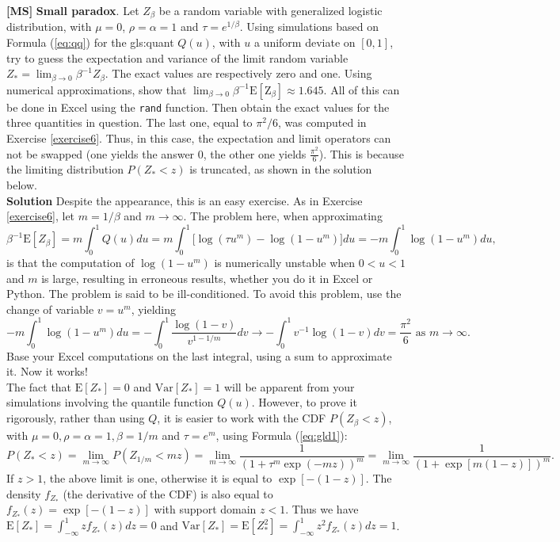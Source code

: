 \documentclass[10pt]{article}
\begin{document}
\begin{Exercise}\label{exercise7}{\bf [MS]} 
 {\bf Small paradox}. Let $Z_\beta$ be a random variable with generalized logistic distribution, with $\mu=0$, $\rho=\alpha=1$ and $\tau=e^{1/\beta}$.
Using simulations based on Formula (\ref{eq:qq}) for the \gls{gls:quant} $Q(u)$, with $u$ a uniform deviate on $[0,1]$, try to guess the expectation and variance of the limit random variable $Z_*=\lim_{\beta\rightarrow 0}\beta^{-1}Z_{\beta}$. The exact values are respectively zero and one. Using numerical approximations, show that $\lim_{\beta\rightarrow 0} \beta^{-1}\mbox{E}[\mbox{Z}_{\beta}]\approx 1.645$. All of this can be done in Excel using the \texttt{rand} function. Then obtain the exact values for the three quantities in question. The last one, equal to $\pi^2/6$, was computed in Exercise \ref{exercise6}. Thus, in this case, the expectation and limit operators can not be swapped 
(one yields the answer $0$, the other one yields $\frac{\pi^2}{6}$). This is because the limiting distribution  $P(Z_*<z)$ 
is \textcolor{index}{truncated}, as shown in the solution below. \vspace{1ex} \\
{\bf Solution} Despite the appearance, this is an easy exercise. As in Exercise \ref{exercise6}, let  $m=1/\beta$ and $m\rightarrow \infty$. The problem here, when approximating 
$$\beta^{-1}\mbox{E}[Z_{\beta}]=m\int_0^1 Q(u)du =m\int_0^1\Big[\log(\tau u^m) - \log(1-u^m)\Big]du
=-m\int_0^1\log(1-u^m)du,$$
is that the computation of $\log(1-u^m)$ is \textcolor{index}{numerically unstable} \cite{num} 
when $0<u<1$ and $m$ is large, resulting in erroneous results, whether you do it in Excel or Python. The problem is said to be ill-conditioned. To avoid this problem, use the change of variable $v=u^m$, yielding
$$-m\int_0^1  \log(1-u^m) du= -\int_0^1\frac{\log(1-v)}{v^{1-1/m}}dv \rightarrow -\int_0^1 v^{-1}\log(1-v)dv = \frac{\pi^2}{6} \mbox{ as } m\rightarrow\infty.$$
Base your Excel computations on the last integral, using a sum to approximate it. Now it works! \vspace{1ex} \\
The fact that $\mbox{E}[Z_*]=0$ and $\mbox{Var}[Z_*]=1$ will be apparent from your simulations involving the quantile function $Q(u)$. However, to prove it rigorously, rather than using $Q$, it is easier to work with the CDF $P(Z_\beta<z)$, with $\mu=0,\rho=\alpha=1,\beta=1/m$ and $\tau=e^m$, using Formula (\ref{eq:gld1}):
$$P(Z_*<z)=\lim_{m\rightarrow\infty}P(Z_{1/m}<mz)=\lim_{m\rightarrow\infty}\frac{1}{(1+\tau^m\exp(-mz))^m}
=\lim_{m\rightarrow\infty}\frac{1}{(1+\exp[m(1-z)])^m}.$$
If $z>1$, the above limit is one, otherwise it is equal to $\exp[-(1-z)]$. The density $f_{Z_*}$ (the derivative of the CDF) is also equal to 
$f_{Z_*}(z)=\exp[-(1-z)]$ with support domain $z<1$. Thus we have $\mbox{E}[Z_*]=\int_{-\infty}^1 z f_{Z_*}(z) dz =0$ and 
$\mbox{Var}[Z_*]=\mbox{E}[Z_*^2]=\int_{-\infty}^1 z^2  f_{Z_*}(z)dz= 1$. 
\end{Exercise}
\end{document}
